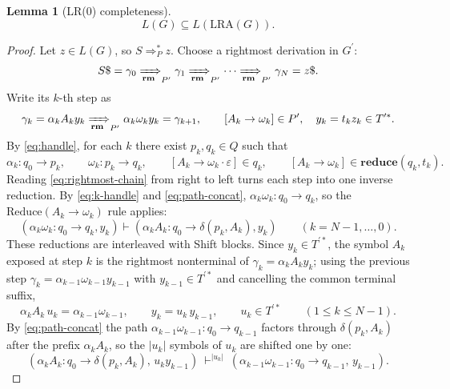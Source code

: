 \documentclass[11pt,a4paper]{article}
\theoremstyle{prettyplain}
\newtheorem{lemma}[theorem]{Lemma}
\theoremstyle{prettydef}
\newcommand{\eps}{\varepsilon}
\newcommand{\LRA}{\mathrm{LRA}}
\newcommand{\RMP}{\xRightarrow[\mathbf{rm}]{}_{P^\prime}}
\newcommand{\DerP}{\Rightarrow_P}
\newcommand{\Path}[3]{#1:#2\to#3}
\newcommand{\Item}[2]{[#1\to #2]}
\newcommand{\Reduce}{\mathbf{reduce}}
\begin{document}
\begin{lemma}[LR(0) completeness]\label{lem:lra-complete}
\[
L(G)\subseteq L(\LRA(G)).
\]
\end{lemma}

\begin{proof}
Let \(z\in L(G)\), so \(S\DerP^*z\).  Choose a rightmost derivation in \(G^\prime\):
\begin{equation}\label{eq:rightmost-chain}
S\$=\gamma_0\RMP\gamma_1\RMP\cdots\RMP\gamma_N=z\$.
\end{equation}
Write its \(k\)-th step as
\begin{equation}\label{eq:k-step}
\gamma_k=\alpha_kA_k y_k
\RMP
\alpha_k\omega_k y_k=\gamma_{k+1},
\qquad
\Item{A_k}{\omega_k}\in P^\prime,\quad y_k=t_k z_k\in T^{\prime *}.
\end{equation}
By \eqref{eq:handle}, for each \(k\) there exist \(p_k,q_k\in Q\) such that
\begin{equation}\label{eq:k-handle}
\Path{\alpha_k}{q_0}{p_k},
\qquad
\Path{\omega_k}{p_k}{q_k},
\qquad
\Item{A_k}{\omega_k\cdot\eps}\in q_k,
\qquad
\Item{A_k}{\omega_k}\in\Reduce(q_k,t_k).
\end{equation}
Reading \eqref{eq:rightmost-chain} from right to left turns each step into one
inverse reduction.  By \eqref{eq:k-handle} and \eqref{eq:path-concat},
\(\Path{\alpha_k\omega_k}{q_0}{q_k}\), so the \(\mathrm{Reduce}(A_k\to\omega_k)\)
rule applies:
\begin{equation}\label{eq:inverse-reduce}
(\Path{\alpha_k\omega_k}{q_0}{q_k},y_k)
\vdash
(\Path{\alpha_kA_k}{q_0}{\delta(p_k,A_k)},y_k)
\qquad(k=N-1,\ldots,0).
\end{equation}
These reductions are interleaved with Shift blocks.  Since \(y_k\in T^{\prime *}\),
the symbol \(A_k\) exposed at step \(k\) is the rightmost nonterminal of
\(\gamma_k=\alpha_kA_ky_k\); using the previous step
\(\gamma_k=\alpha_{k-1}\omega_{k-1}y_{k-1}\) with \(y_{k-1}\in T^{\prime *}\) and
cancelling the common terminal suffix,
\begin{equation}\label{eq:shift-block}
\alpha_kA_k\,u_k=\alpha_{k-1}\omega_{k-1},
\qquad
y_k=u_k\,y_{k-1},
\qquad
u_k\in T^{\prime *}
\qquad(1\le k\le N-1).
\end{equation}
By \eqref{eq:path-concat} the path \(\Path{\alpha_{k-1}\omega_{k-1}}{q_0}{q_{k-1}}\)
factors through \(\delta(p_k,A_k)\) after the prefix \(\alpha_kA_k\), so the
\(|u_k|\) symbols of \(u_k\) are shifted one by one:
\[
(\Path{\alpha_kA_k}{q_0}{\delta(p_k,A_k)},\,u_ky_{k-1})
\ \vdash^{|u_k|}\
(\Path{\alpha_{k-1}\omega_{k-1}}{q_0}{q_{k-1}},\,y_{k-1}).
\]
\end{proof}
\end{document}

